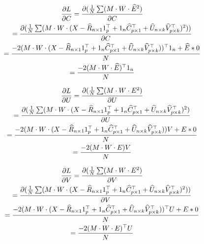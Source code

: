 \documentclass{article}
\begin{document}
\begin{gather*}
    \pdv{L}{C} = \pdv{(\frac{1}{N}\sum(M \cdot W \cdot \widehat{E}^2)}{C} \\
    = \pdv{(\frac{1}{N}\sum(M \cdot W \cdot (X - \widehat{R}_{n \times 1}1^{\top}_{p} + 1_{n}\widehat{C}_{p \times 1}^{\top} + \widehat{U}_{n \times k}\widehat{V}^{\top}_{p \times k})^2))}{C}\\
    = \frac{-2(M \cdot W \cdot (X - \widehat{R}_{n \times 1}1^{\top}_{p} + 1_{n}\widehat{C}_{p \times 1}^{\top} + \widehat{U}_{n \times k}\widehat{V}^{\top}_{p \times k}))^\top1_{n} + \widehat{E} * 0}{N}\\
    = \frac{-2(M \cdot W \cdot \widehat{E})^\top1_{n}}{N}
\end{gather*}

\begin{gather*}
    \pdv{L}{U} = \pdv{(\frac{1}{N}\sum(M \cdot W \cdot E^2)}{U} \\
    = \pdv{(\frac{1}{N}\sum(M \cdot W \cdot (X - \widehat{R}_{n \times 1}1^{\top}_{p} + 1_{n}\widehat{C}_{p \times 1}^{\top} + \widehat{U}_{n \times k}\widehat{V}^{\top}_{p \times k})^2)}{U}\\
    = \frac{-2(M \cdot W \cdot (X - \widehat{R}_{n \times 1}1^{\top}_{p} + 1_{n}\widehat{C}_{p \times 1}^{\top} + \widehat{U}_{n \times k}\widehat{V}^{\top}_{p \times k}))V + E * 0}{N}\\
    = \frac{-2(M \cdot W \cdot E)V }{N}
\end{gather*}

\begin{gather*}
    \pdv{L}{V} = \pdv{(\frac{1}{N}\sum(M \cdot W \cdot E^2)}{V} \\
    = \pdv{(\frac{1}{N}\sum(M \cdot W \cdot (X - \widehat{R}_{n \times 1}1^{\top}_{p} + 1_{n}\widehat{C}_{p \times 1}^{\top} + \widehat{U}_{n \times k}\widehat{V}^{\top}_{p \times k})^2))}{V}\\
    = \frac{-2(M \cdot W \cdot (X - \widehat{R}_{n \times 1}1^{\top}_{p} + 1_{n}\widehat{C}_{p \times 1}^{\top} + \widehat{U}_{n \times k}\widehat{V}^{\top}_{p \times k}))^\top U + E*0}{N}\\
    = \frac{-2(M \cdot W \cdot E)^\top U}{N}
\end{gather*}
\end{document}
